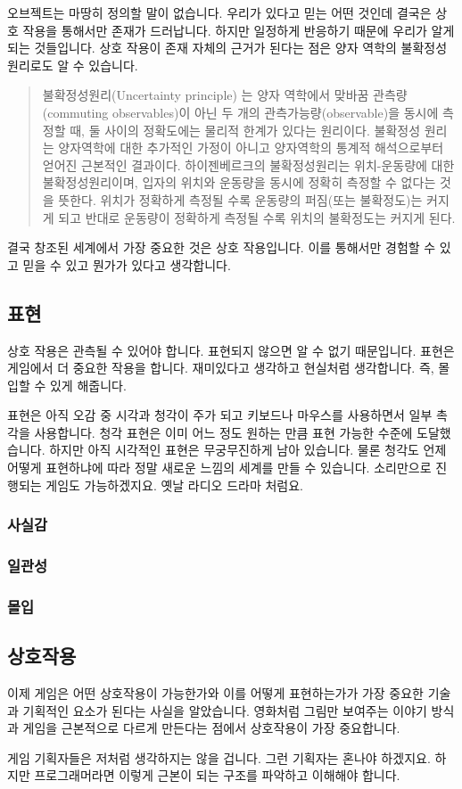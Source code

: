 \documentclass[chapter,kosection, 10.5pt, romanfixed, a4paper]{oblivoir}
\newenvironment{smallquote}
{\begin{quote}\small} {\end{quote}}
\begin{document}
오브젝트는 마땅히 정의할 말이 없습니다. 우리가 있다고 믿는 어떤 것인데 결국은 상호 작용을 
통해서만 존재가 드러납니다. 하지만 일정하게 반응하기 때문에 우리가 알게 되는 것들입니다. 
상호 작용이 존재 자체의 근거가 된다는 점은 양자 역학의 불확정성 원리로도 알 수 있습니다. 

\begin{smallquote}
불확정성원리(Uncertainty principle) 는 양자 역학에서 맞바꿈 관측량(commuting observables)이 아닌 두 개의 
관측가능량(observable)을 동시에 측정할 때, 둘 사이의 정확도에는 물리적 한계가 있다는 원리이다. 
불확정성 원리는 양자역학에 대한 추가적인 가정이 아니고 양자역학의 통계적 해석으로부터 얻어진 근본적인 결과이다. 
하이젠베르크의 불확정성원리는 위치-운동량에 대한 불확정성원리이며, 입자의 위치와 운동량을 동시에 정확히 
측정할 수 없다는 것을 뜻한다. 위치가 정확하게 측정될 수록 운동량의 퍼짐(또는 불확정도)는 커지게 되고 
반대로 운동량이 정확하게 측정될 수록 위치의 불확정도는 커지게 된다.
\end{smallquote}

결국 창조된 세계에서 가장 중요한 것은 상호 작용입니다. 이를 통해서만 경험할 수 있고 믿을 수 있고 
뭔가가 있다고 생각합니다. 

\subsection{표현}

상호 작용은 관측될 수 있어야 합니다. 표현되지 않으면 알 수 없기 때문입니다. 표현은 게임에서 
더 중요한 작용을 합니다. 재미있다고 생각하고 현실처럼 생각합니다. 즉, 몰입할 수 있게 해줍니다. 

표현은 아직 오감 중 시각과 청각이 주가 되고 키보드나 마우스를 사용하면서 일부 촉각을 사용합니다. 
청각 표현은 이미 어느 정도 원하는 만큼 표현 가능한 수준에 도달했습니다. 하지만 아직 시각적인 표현은 
무궁무진하게 남아 있습니다. 물론 청각도 언제 어떻게 표현하냐에 따라 정말 새로운 느낌의 세계를 
만들 수 있습니다. 소리만으로 진행되는 게임도 가능하겠지요. 옛날 라디오 드라마 처럼요. 

\subsubsection{사실감}

\subsubsection{일관성}

\subsubsection{몰입}


\subsection{상호작용}

이제 게임은 어떤 상호작용이 가능한가와 이를 어떻게 표현하는가가 가장 중요한 기술과 기획적인 요소가 된다는
사실을 알았습니다. 영화처럼 그림만 보여주는 이야기 방식과 게임을 근본적으로 다르게 만든다는 점에서 
상호작용이 가장 중요합니다. 


게임 기획자들은 저처럼 생각하지는 않을 겁니다. 그런 기획자는 혼나야 하겠지요. 하지만 프로그래머라면
이렇게 근본이 되는 구조를 파악하고 이해해야 합니다. 
\end{document}
